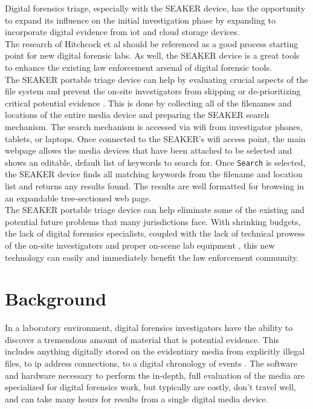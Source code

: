 \documentclass[12pt]{article}
\begin{document}
Digital forensics triage, especially with
the SEAKER device, has the opportunity to expand its influence on the initial
investigation phase by expanding to incorporate digital evidence from
\gls{iot} and cloud storage devices.\\

The research of Hitchcock et al \cite{hitchcock2016tiered} should be referenced as a good
process starting point for new digital forensic labs.  As well, the SEAKER device is a 
great tools to enhance the existing law enforcement arsenal of digital forensic tools.\\

The SEAKER portable triage device can help by evaluating crucial
aspects of the file system and prevent the on-site investigators from skipping or
de-prioritizing critical potential evidence \cite{rogers2006computer}.  This is done by
collecting all of the filenames and locations of the entire media device and preparing
the SEAKER search mechanism.  The search mechanism is accessed via \gls{wifi} from 
investigator phones, tablets, or laptops.  Once connected to the SEAKER's \gls{wifi}
access point, the main webpage allows the media devices that have been 
attached to be selected and shows an editable, default list of keywords to search
for.  Once \verb|Search| is selected, the SEAKER device finds all matching keywords
from the filename and location list and returns any results found.  The results are
well formatted for browsing in an expandable tree-sectioned web page.\\

The SEAKER portable triage device can help eliminate some of the existing and
potential future problems that many jurisdictions face.  With shrinking budgets,
the lack of digital forensics specialists, coupled with the lack of technical prowess
of the on-site investigators and proper on-scene lab equipment \cite{rogers2006computer},
this new technology can easily and immediately benefit the law enforcement community.\\

\section{Background}
\label{sect-background}

In a laboratory environment, digital forensics investigators have the ability to discover
a tremendous amount of material that is potential evidence.  This includes anything 
digitally stored on the evidentiary media from
explicitly illegal files, to \gls{ip} address connections, to a digital chronology of
events \cite{raghavan2013digital} \cite{rogers2006computer}.
The software and hardware necessary to perform the
in-depth, full evaluation of the media are specialized for digital forensics 
work, but typically are costly, don't travel well, and can take many hours for
results from a single digital media device.\\
\end{document}
